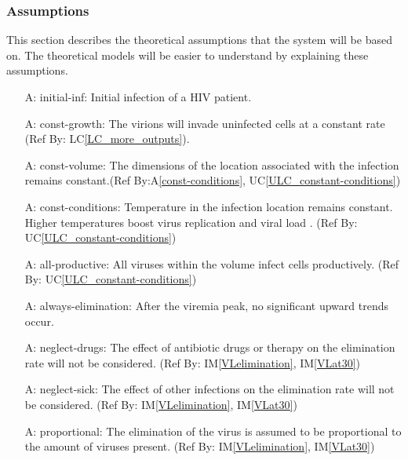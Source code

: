 \documentclass[12pt]{article}
\newcounter{assumpnum} %
\newcommand{\aref}[1]{A\ref{#1}}
\newcommand{\iref}[1]{IM\ref{#1}}
\newcommand{\lcref}[1]{LC\ref{#1}}
\newcommand{\ucref}[1]{UC\ref{#1}}
\begin{document}
\subsubsection{Assumptions} \label{sec_assumpt}


This section describes the theoretical assumptions that the system will be 
based on. The theoretical models will be easier to understand by explaining 
these assumptions.

  
\begin{itemize}

\item[A\refstepcounter{assumpnum}\theassumpnum \label{initial-inf}:]
initial-inf: Initial infection of a HIV patient.

\item[A\refstepcounter{assumpnum}\theassumpnum \label{const-growth}:]
const-growth: The virions will invade uninfected cells at a constant 
rate (Ref By: \lcref{LC_more_outputs}).
  
\item[A\refstepcounter{assumpnum}\theassumpnum \label{const-volume}:]
const-volume: The dimensions of the location associated with the 
infection remains constant.(Ref By:\aref{const-conditions}, 
\ucref{ULC_constant-conditions})
  
\item[A\refstepcounter{assumpnum}\theassumpnum \label{const-conditions}:]
const-conditions: Temperature in the infection location remains constant. 
Higher temperatures boost virus replication and viral load 
\citep{10.1371/journal.ppat.1002792}. (Ref By:  
\ucref{ULC_constant-conditions})

  
\item[A\refstepcounter{assumpnum}\theassumpnum \label{all-productive}:]
all-productive: All viruses within the volume  infect cells productively. 
(Ref By: 
\ucref{ULC_constant-conditions})
  
\item[A\refstepcounter{assumpnum}\theassumpnum \label{always-elimination}:]
always-elimination: After the viremia peak, no significant upward trends occur.
   
\item[A\refstepcounter{assumpnum}\theassumpnum \label{neglect-drugs}:]
neglect-drugs: The effect of antibiotic drugs or therapy on the elimination rate 
will not be considered. (Ref By: \iref{VLelimination}, \iref{VLat30})
  
\item[A\refstepcounter{assumpnum}\theassumpnum \label{neglect-sick}:]
neglect-sick: The effect of other infections on the elimination rate will not be 
considered. (Ref By: \iref{VLelimination}, \iref{VLat30})

\item[A\refstepcounter{assumpnum}\theassumpnum \label{proportional}:]
proportional: The elimination of the virus is assumed to be proportional to the 
amount of viruses present. (Ref By: \iref{VLelimination}, \iref{VLat30})

\end{itemize}
\end{document}
